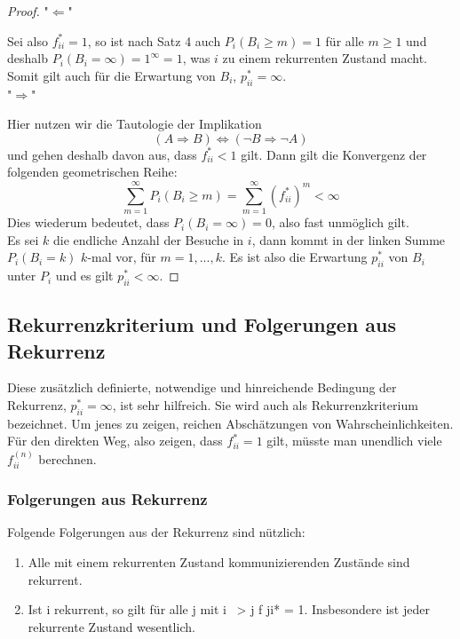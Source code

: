 \documentclass[a4paper]{article}
\begin{document}
\begin{proof}
	"$\Leftarrow$"

	Sei also $f_{ii} ^{*} =1$, so ist nach Satz 4 auch 
	$P_i \left(
		B_i \geq m
	\right) = 1$
	für alle $m \geq 1$ und deshalb 
	$P_i \left(
		B_i = \infty
	\right) = 1 ^{\infty} = 1$,
	was $i$ zu einem rekurrenten Zustand macht. 
	Somit gilt auch für die Erwartung von $B_i$, $p_{ii} ^{*} = \infty$.
	\\

	"$\Rightarrow$"

	Hier nutzen wir die Tautologie der Implikation 
	\[
	\left(
		A \Rightarrow B
	\right) \Leftrightarrow 
	\left(
		\neg B \Rightarrow \neg A
	\right) 
	\] 
	und gehen deshalb
	davon aus, dass $f_{ii} ^{*} < 1$ gilt. Dann gilt die Konvergenz der folgenden geometrischen Reihe:
	\[
	\sum_{m=1}^{\infty} P_i \left(
		B_i \geq m
	\right) = \sum_{m=1}^{\infty} \left(
		f_{ii} ^{*}
	\right) ^{m} < \infty
	\] 
	Dies wiederum bedeutet, dass $P_i (B_i = \infty) = 0$, also fast unmöglich gilt.
	\\

	Es sei $k$ die endliche Anzahl der Besuche in $i$, dann kommt in der linken Summe $P_i \left(
		B_i = k
	\right) $ $k$-mal
	vor, für $m=1,...,k$. Es ist also die Erwartung $p_{ii} ^{*}$ von $B_i$ unter $P_i$ und es gilt $p_{ii} ^{*} < \infty$.
\end{proof}

\subsection{Rekurrenzkriterium und Folgerungen aus Rekurrenz}
Diese zusätzlich definierte, notwendige und hinreichende Bedingung der Rekurrenz, $p_{ii} ^{*} = \infty$, ist
sehr hilfreich. Sie wird auch als Rekurrenzkriterium bezeichnet. 
Um jenes zu zeigen, reichen
Abschätzungen von Wahrscheinlichkeiten. 
\\

Für den direkten Weg, also zeigen, dass $f_{ii} ^{*} = 1$ gilt,
müsste man unendlich viele $f_{ii} ^{(n)}$ berechnen.

\subsubsection{Folgerungen aus Rekurrenz}
Folgende Folgerungen aus der Rekurrenz sind nützlich:

\begin{enumerate}
	\item Alle mit einem rekurrenten Zustand kommunizierenden Zustände sind rekurrent.
	\item Ist i rekurrent, so gilt für alle j mit i ~> j f ji* = 1. Insbesondere ist jeder rekurrente Zustand wesentlich.
\end{enumerate}
\end{document}
